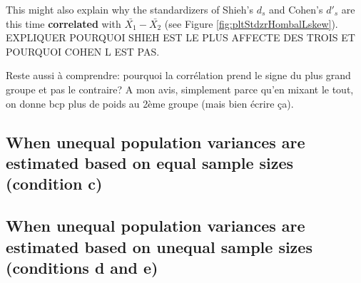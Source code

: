 \documentclass[
  man]{apa6}
\begin{document}
This might also explain why the standardizers of Shieh's \(d_s\) and Cohen's \(d'_s\) are this time \textbf{correlated} with \(\bar{X_1}-\bar{X_2}\) (see Figure \ref{fig:pltStdzrHombalLskew}). EXPLIQUER POURQUOI SHIEH EST LE PLUS AFFECTE DES TROIS ET POURQUOI COHEN L EST PAS.

Reste aussi à comprendre: pourquoi la corrélation prend le signe du plus grand groupe et pas le contraire? A mon avis, simplement parce qu'en mixant le tout, on donne bcp plus de poids au 2ème groupe (mais bien écrire ça).

\hypertarget{when-unequal-population-variances-are-estimated-based-on-equal-sample-sizes-condition-c}{%
\subsection{When unequal population variances are estimated based on equal sample sizes (condition c)}\label{when-unequal-population-variances-are-estimated-based-on-equal-sample-sizes-condition-c}}

\hypertarget{when-unequal-population-variances-are-estimated-based-on-unequal-sample-sizes-conditions-d-and-e}{%
\subsection{When unequal population variances are estimated based on unequal sample sizes (conditions d and e)}\label{when-unequal-population-variances-are-estimated-based-on-unequal-sample-sizes-conditions-d-and-e}}
\end{document}
